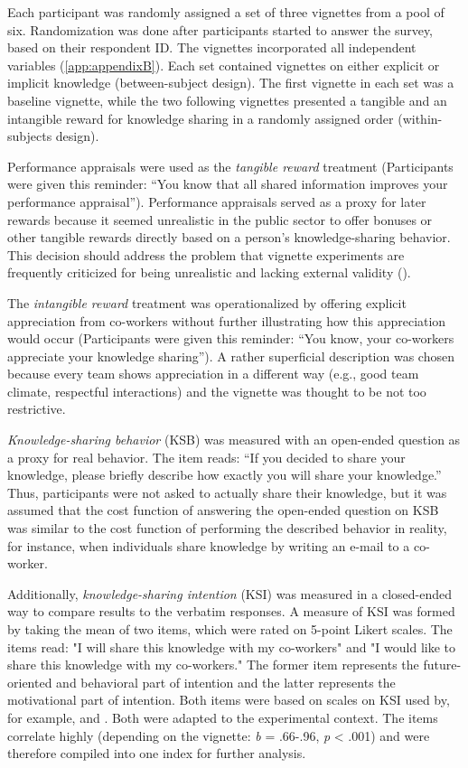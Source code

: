 \documentclass[twocolumn, serif, empirical, authordate]{jote-article}
\begin{document}
Each participant was randomly assigned a set of three vignettes from a pool of six. Randomization was done after participants started to answer the survey, based on their respondent ID. The vignettes incorporated all independent variables (\autoref{app:appendixB}). Each set contained vignettes on either explicit or implicit knowledge (between-subject design). The first vignette in each set was a baseline vignette, while the two following vignettes presented a tangible and an intangible reward for knowledge sharing in a randomly assigned order (within-subjects design).

Performance appraisals were used as the \emph{tangible reward} treatment (Participants were given this reminder: ``You know that all shared information improves your performance appraisal''). Performance appraisals served as a proxy for later rewards because it seemed unrealistic in the public sector to offer bonuses or other tangible rewards directly based on a person's knowledge-sharing behavior. This decision should address the problem that vignette experiments are frequently criticized for being unrealistic and lacking external validity ().

The \emph{intangible reward} treatment was operationalized by offering explicit appreciation from co-workers without further illustrating how this appreciation would occur (Participants were given this reminder: ``You know, your co-workers appreciate your knowledge sharing''). A rather superficial description was chosen because every team shows appreciation in a different way (e.g., good team climate, respectful interactions) and the vignette was thought to be not too restrictive.

\emph{Knowledge-sharing behavior} (KSB) was measured with an open-ended question as a proxy for real behavior. The item reads: ``If you decided to share your knowledge, please briefly describe how exactly you will share your knowledge.'' Thus, participants were not asked to actually share their knowledge, but it was assumed that the cost function of answering the open-ended question on KSB was similar to the cost function of performing the described behavior in reality, for instance, when individuals share knowledge by writing an e-mail to a co-worker.

Additionally, \emph{knowledge-sharing intention} (KSI) was measured in a closed-ended way to compare results to the verbatim responses. A measure of KSI was formed by taking the mean of two items, which were rated on 5-point Likert scales. The items read: "I will share this knowledge with my co-workers" and "I would like to share this knowledge with my co-workers." The former item represents the future-oriented and behavioral part of intention and the latter represents the motivational part of intention. Both items were based on scales on KSI used by, for example, \textcite{Bock2002} and \textcite{Lin2007}. Both were adapted to the experimental context. The items correlate highly (depending on the vignette: \emph{b} = .66-.96, \emph{p} \textless{} .001) and were therefore compiled into one index for further analysis.
\end{document}
